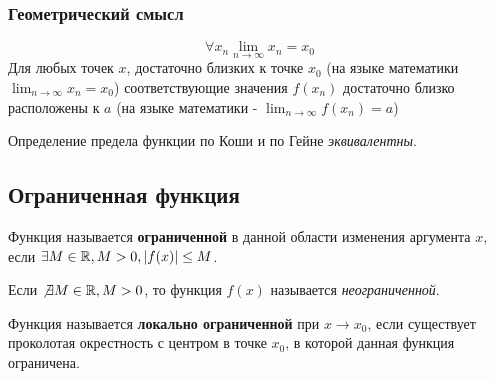 \subsubsection*{Геометрический смысл}

\[
\forall x_{n} \lim_{n \to \infty} x_{n} = x_0
\] 
Для любых точек $x$, достаточно близких к точке $x_0$ (на языке математики $\lim_{n \to \infty} x_{n} = x_0$) соответствующие значения $f(x_{n})$ достаточно близко расположены к $a$ (на языке математики - $\lim_{n \to \infty} f(x_{n}) = a$)

\begin{theorem}
  Определение предела функции по Коши и по Гейне \textit{эквивалентны}. 
\end{theorem}

\subsection{Ограниченная функция}

\begin{definition}
  Функция называется \textbf{ограниченной} в данной области изменения аргумента $x$, если $\exists M\in \mathbb{R}, M > 0, |f(x)| \le M$.
\end{definition}

Если $\not \exists M \in \mathbb{R}, M > 0$, то функция $f(x)$ называется \textit{неограниченной}.

\begin{definition}
  Функция называется \textbf{локально ограниченной} при $x \to x_0$, если существует проколотая окрестность с центром в точке $x_0$, в которой данная функция ограничена.
\end{definition}

